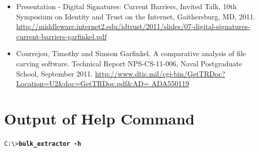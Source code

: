 \documentclass[11pt]{article} %
\begin{document}
\begin{itemize}
\item Presentation - Digital Signatures: Current Barriers, Invited Talk, 10th Symposium on Identity and Trust on the Internet, Gaithersburg, MD, 2011. \url{http://middleware.internet2.edu/idtrust/2011/slides/07-digital-signatures-current}\newline\url{-barriers-garfinkel.pdf}
\item Courrejou, Timothy and Simson Garfinkel. A comparative analysis of file carving software. Technical Report NPS-CS-11-006, Naval Postgraduate School, September 2011. \url{http://www.dtic.mil/cgi-bin/GetTRDoc?Location=U2&doc=GetTRDoc.pdf&AD=}\newline\url{ ADA550119}
\end{itemize}


 


\newpage
\appendix
\appendixpage



\section{Output of \bulk Help Command}
\label{HelpOutput}

\begingroup
\footnotesize
\texttt{C:\textbackslash \textgreater \textbf{bulk\_extractor -h}}
\endgroup

\begingroup
\footnotesize
{
\selectfont

}
\endgroup
\end{document}
